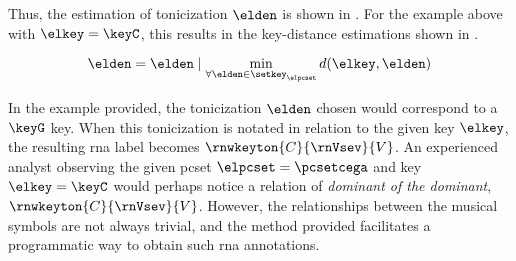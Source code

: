 Thus, the estimation of tonicization $\elden$ is shown in
. For the example above with
$\elkey = \keyC$, this results in the key-distance
estimations shown in
.

\begin{equation}
    \label{eq:tonicization_estimation}
    \elden = \elden \mid \min_{\forall \elden \in \setkey_\elpcset} d(\elkey, \elden)
\end{equation}


In the example provided, the tonicization $\elden$ chosen
would correspond to a $\keyG$ key. When this tonicization is
notated in relation to the given key $\elkey$, the resulting
\gls{rna} label becomes $\rnwkeyton{C}{\rnVsev}{V}$. An
experienced analyst observing the given \gls{pcset}
$\elpcset = \pcsetcega$ and key $\elkey = \keyC$ would
perhaps notice a relation of \emph{dominant of the
dominant}, $\rnwkeyton{C}{\rnVsev}{V}$. However, the
relationships between the musical symbols are not always
trivial, and the method provided facilitates a programmatic
way to obtain such \gls{rna} annotations.

